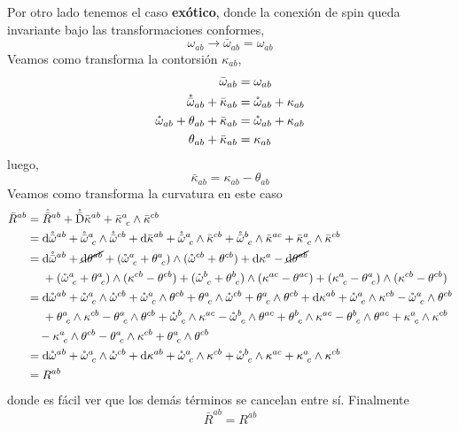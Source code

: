 Por otro lado tenemos el caso \textbf{exótico}, donde la conexión de spin queda invariante bajo las transformaciones conformes, 
\begin{equation}
  \omega_{ab}\to \bar{\omega}_{ab}=\omega_{ab}
\end{equation}
Veamos como transforma la contorsión $\kappa_{ab}$,
\begin{align}
  \bar{\omega}_{ab}&=\omega_{ab}\\
  \mathring{\bar{\omega}}_{ab}+\bar{\kappa}_{ab}&=\mathring{\omega}_{ab}+\kappa_{ab}\\
  \mathring{\omega}_{ab}+\theta_{ab}+\bar{\kappa}_{ab}&=\mathring{\omega}_{ab}+\kappa_{ab}\\
  \theta_{ab}+\bar{\kappa}_{ab}&=\kappa_{ab}
\end{align}
luego,
\begin{equation}
\boxed{\bar{\kappa}_{ab}=\kappa_{ab}-\theta_{ab}}
\end{equation}
Veamos como transforma la curvatura en este caso
\begin{align*}
  \bar{R}^{ab}&=\mathring{\bar{R}}^{ab}+\mathring{\bar{\mathrm{D}}}\bar{\kappa}^{ab}+\bar{\kappa}^{a}_{~c}\wedge \bar{\kappa}^{cb}\\
  &=\dd\mathring{\bar{\omega}}^{ab}+\mathring{\bar{\omega}}^{a}_{~c}\wedge\mathring{\bar{\omega}}^{cb}+\dd\bar{\kappa}^{ab}+\mathring{\bar{\omega}}^{a}_{~c}\wedge \bar{\kappa}^{cb}+\mathring{\bar{\omega}}^{b}_{~c}\wedge \bar{\kappa}^{ac}+\bar{\kappa}^{a}_{~c}\wedge\bar{\kappa}^{cb}\\
  &=\dd\mathring{\bar{\omega}}^{ab}+\cancel{\dd\theta^{ab}}+(\mathring{\omega}^{a}_{~c}+\theta^{a}_{~c})\wedge (\mathring{\omega}^{cb}+\theta^{cb})+\dd\kappa^{a}-\cancel{\dd\theta^{ab}}\\&
  ~~~~+(\mathring{\omega}^{a}_{~c}+\theta^{a}_{~c})\wedge (\kappa^{cb}-\theta^{cb})+(\mathring{\omega}^b_{~c}+\theta^b_{~c})\wedge (\kappa^{ac}-\theta^{ac})+(\kappa^{a}_{~c}-\theta^{a}_{~c})\wedge (\kappa^{cb}-\theta^{cb})\\
  &=\dd\mathring{\omega}^{ab}+\mathring{\omega}^{a}_{~c}\wedge\mathring{\omega}^{cb}+\mathring{\omega}^{a}_{~c}\wedge\theta^{cb}+\theta^{a}_{~c}\wedge\mathring{\omega}^{cb}+\theta^{a}_{~c}\wedge\theta^{cb}+\dd\kappa^{ab}+\mathring{\omega}^{a}_{~c}\wedge\kappa^{cb}-\mathring{\omega}^{a}_{~c}\wedge\theta^{cb}\\
  &~~~~+\theta^{a}_{~c}\wedge\kappa^{cb}-\theta^{a}_{~c}\wedge\theta^{cb}+\mathring{\omega}^b_{~c}\wedge\kappa^{ac}-\mathring{\omega}^b_{~c}\wedge\theta^{ac}+\theta^b_{~c}\wedge\kappa^{ac}-\theta^b_{~c}\wedge\theta^{ac}+\kappa^{a}_{~c}\wedge\kappa^{cb}\\
  &~~~-\kappa^{a}_{~c}\wedge\theta^{cb}-\theta^{a}_{~c}\wedge \kappa^{cb}+\theta^{a}_{~c}\wedge\theta^{cb}\\
  &=\dd\mathring{\omega}^{ab}+\mathring{\omega}^{a}_{~c}\wedge \mathring{\omega}^{cb}+\dd\kappa^{ab}+\mathring{\omega}^{a}_{~c}\wedge\kappa^{cb}+\mathring{\omega}^b_{~c}\wedge\kappa^{ac}+\kappa^{a}_{~c}\wedge\kappa^{cb}\\
  &=R^{ab}
\end{align*}
donde es fácil ver que los demás términos se cancelan entre sí. Finalmente
\begin{equation}
   \boxed{\bar{R}^{ab}=R^{ab}}
\end{equation}


